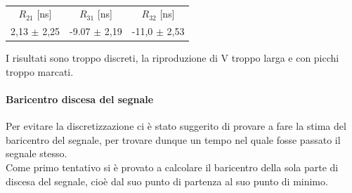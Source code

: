 \documentclass[a4paper,twocolumn]{article}
\begin{document}
\begin{table}[H]
\begin{tabular}{c|c|c}
$R_{21}$ [ns] & $R_{31}$ [ns] & $R_{32}$ [ns] \\
\hfill
2,13 $\pm$ 2,25 & -9.07 $\pm$ 2,19 & -11,0 $\pm$ 2,53
\hfill
\end{tabular}
\caption{}
\label{tab:RitMidNegSlo}
\end{table}
I risultati sono troppo discreti, la riproduzione di V troppo larga e con picchi troppo marcati.


\paragraph{Baricentro discesa del segnale}
Per evitare la discretizzazione ci è stato suggerito di provare a fare la stima del baricentro del segnale, per trovare dunque un tempo nel quale fosse passato il segnale stesso.\\
Come primo tentativo si è provato a calcolare il baricentro della sola parte di discesa del segnale, cioè dal suo punto di partenza al suo punto di minimo.
\end{document}
